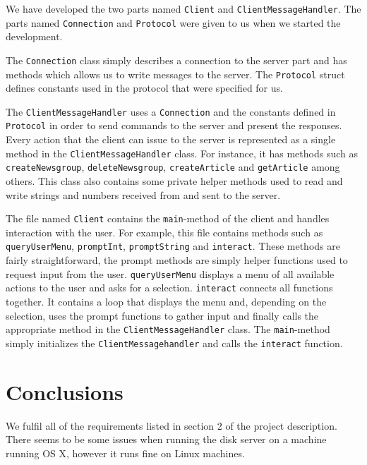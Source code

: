 \documentclass[a4paper]{article}
\begin{document}
We have developed the two parts named \texttt{Client} and \texttt{ClientMessageHandler}. The parts named \texttt{Connection} and \texttt{Protocol} were given to us when we started the development.

The \texttt{Connection} class simply describes a connection to the server part and has methods which allows us to write messages to the server. The \texttt{Protocol} struct defines constants used in the protocol that were specified for us.

The \texttt{ClientMessageHandler} uses a \texttt{Connection} and the constants defined in \texttt{Protocol} in order to send commands to the server and present the responses. Every action that the client can issue to the server is represented as a single method in the \texttt{ClientMessageHandler} class. For instance, it has methods such as \texttt{createNewsgroup}, \texttt{deleteNewsgroup}, \texttt{createArticle} and \texttt{getArticle} among others. This class also contains some private helper methods used to read and write strings and numbers received from and sent to the server.

The file named \texttt{Client} contains the \texttt{main}-method of the client and handles interaction with the user. For example, this file contains methods such as \texttt{queryUserMenu}, \texttt{promptInt}, \texttt{promptString} and \texttt{interact}. These methods are fairly straightforward, the prompt methods are simply helper functions used to request input from the user. \texttt{queryUserMenu} displays a menu of all available actions to the user and asks for a selection. \texttt{interact} connects all functions together. It contains a loop that displays the menu and, depending on the selection, uses the prompt functions to gather input and finally calls the appropriate method in the \texttt{ClientMessageHandler} class. The \texttt{main}-method simply initializes the \texttt{ClientMessagehandler} and calls the \texttt{interact} function.

\section{Conclusions}
We fulfil all of the requirements listed in section 2 of the project description.
There seems to be some issues when running the disk server on a machine running OS X, however it runs fine on Linux machines.
\end{document}
